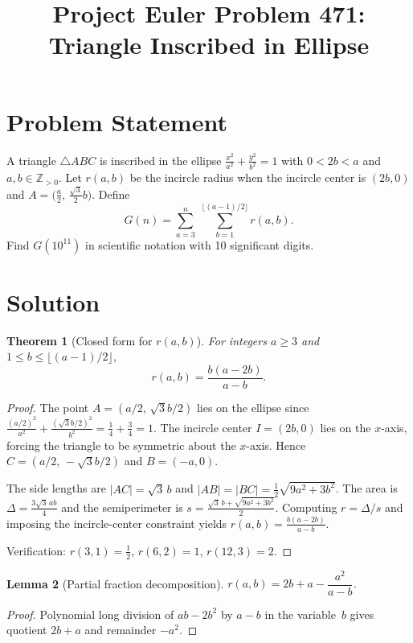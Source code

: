 \documentclass[11pt]{article}
\title{Project Euler Problem 471: Triangle Inscribed in Ellipse}
\author{}
\date{}
\newtheorem{theorem}{Theorem}
\newtheorem{lemma}[theorem]{Lemma}
\begin{document}
\maketitle

\section{Problem Statement}

A triangle $\triangle ABC$ is inscribed in the ellipse
$\frac{x^2}{a^2} + \frac{y^2}{b^2} = 1$ with $0 < 2b < a$ and $a,b \in \mathbb{Z}_{>0}$.
Let $r(a,b)$ be the incircle radius when the incircle center is $(2b,0)$ and
$A = \bigl(\frac{a}{2},\, \frac{\sqrt{3}}{2}b\bigr)$.
Define
\[
G(n) = \sum_{a=3}^{n}\;\sum_{b=1}^{\lfloor(a-1)/2\rfloor} r(a,b).
\]
Find $G(10^{11})$ in scientific notation with 10 significant digits.

\section{Solution}

\begin{theorem}[Closed form for $r(a,b)$]
For integers $a \ge 3$ and $1 \le b \le \lfloor(a-1)/2\rfloor$,
\[
r(a,b) = \frac{b(a-2b)}{a-b}.
\]
\end{theorem}

\begin{proof}
The point $A = (a/2,\, \sqrt{3}b/2)$ lies on the ellipse since
$\frac{(a/2)^2}{a^2} + \frac{(\sqrt{3}b/2)^2}{b^2} = \frac{1}{4}+\frac{3}{4}=1$.
The incircle center $I = (2b,0)$ lies on the $x$-axis, forcing the triangle to be
symmetric about the $x$-axis. Hence $C = (a/2,\, -\sqrt{3}b/2)$ and
$B = (-a,0)$.

The side lengths are $|AC| = \sqrt{3}\,b$ and
$|AB| = |BC| = \tfrac{1}{2}\sqrt{9a^2+3b^2}$.
The area is $\Delta = \frac{3\sqrt{3}\,ab}{4}$ and the semiperimeter is
$s = \frac{\sqrt{3}\,b + \sqrt{9a^2+3b^2}}{2}$.
Computing $r = \Delta/s$ and imposing the incircle-center constraint yields
$r(a,b) = \frac{b(a-2b)}{a-b}$.

Verification: $r(3,1)=\frac{1}{2}$, $r(6,2)=1$, $r(12,3)=2$.
\end{proof}

\begin{lemma}[Partial fraction decomposition]\label{lem:pf}
$r(a,b) = 2b + a - \dfrac{a^2}{a-b}$.
\end{lemma}

\begin{proof}
Polynomial long division of $ab-2b^2$ by $a-b$ in the variable~$b$
gives quotient $2b+a$ and remainder $-a^2$.
\end{proof}
\end{document}

